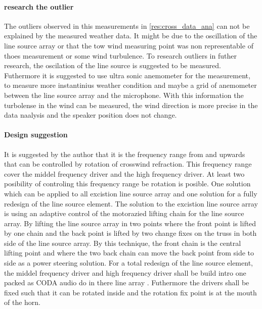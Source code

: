 \paragraph{research the outlier}
The outliers observed in this measurements in \autoref{res:cross_data_ana} can not be explained by the measured weather data. It might be due to the oscillation of the line source array or that the tow wind measuring point was non representable of thoes measurement or some wind turbulence. To research outliers in futher research, the oscilation of the line source is suggested to be measured. Futhermore it is suggested to use ultra sonic anemometer for the measurement, to measure more instantinius weather condition and maybe a grid of anemometer between the line source array and the microphone. With this information the turbolense in the wind can be measured, the wind direction is more precise in the data naalysis and the speaker position does not change. 




\paragraph{Design suggestion} 
It is suggested by the author that it is the frequency range from  and upwards that can be controlled by rotation of crosswind refraction. This frequency range cover the middel frequency driver and the high frequency driver. At least two posibility of controling this frequency range be rotation is posible. One solution which can be applied to all excistion line source array and one solution for a fully redesign of the line source element. The solution to the excistion line source array is using an adaptive control of the motorazied lifting chain for the line source array. By lifting the line source array in two points where the front point is lifted by one chain and the back point is lifted by two change fixes on the truss in both side of the line source array. By this technique, the front chain is the central lifting point and where the two back chain can move the back point from side to side as a power steering solution. For a total redesign of the line source element, the middel frequency driver and high frequency driver shall be build intro one packed as CODA audio do in there line array \citep{coda_ddp}. Futhermore the drivers shall be fixed such that it can be rotated inside and the rotation fix point is at the mouth of the horn.   



